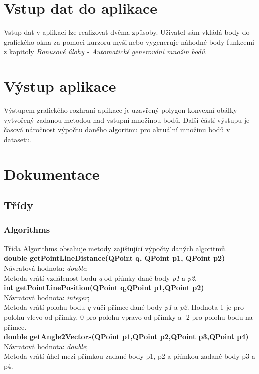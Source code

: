 \documentclass[a4paper, 12pt]{article}
\begin{document}
\section{Vstup dat do aplikace}
Vstup dat v aplikaci lze realizovat dvěma způsoby. Uživatel sám vkládá body do grafického okna za pomoci kurzoru myši nebo vygeneruje náhodné body funkcemi z kapitoly \textit{Bonusové úlohy - Automatické generování množin bodů}.

\section{Výstup aplikace}
Výstupem grafického rozhraní aplikace je uzavřený polygon konvexní obálky vytvořený zadanou metodou nad vstupní množinou bodů. Další částí výstupu je časová náročnost výpočtu daného algoritmu pro aktuální množinu bodů v datasetu. 

\section{Dokumentace}
\subsection{Třídy}
\subsubsection{Algorithms}
Třída Algorithms obsahuje metody zajišťující výpočty daných algoritmů.
\\

\textbf{double getPointLineDistance(QPoint q, QPoint p1, QPoint p2)}\\
Návratová hodnota: \textit{double};\\
Metoda vrátí vzdálenost bodu \textit{q} od přímky dané body\textit{ p1} a \textit{p2}.
\\

\textbf{int getPointLinePosition(QPoint q,QPoint p1,QPoint p2)}\\
Návratová hodnota: \textit{integer};\\
Metoda vrátí polohu bodu \textit{q} vůči přímce dané body\textit{ p1} a \textit{p2}. Hodnota 1 je pro polohu vlevo od přímky, 0 pro polohu vpravo od přímky a -2 pro polohu bodu na přímce.
\\

\textbf{double getAngle2Vectors(QPoint p1,QPoint p2,QPoint p3,QPoint p4)}\\
Návratová hodnota: \textit{double};\\
Metoda vrátí úhel mezi přímkou zadané body p1, p2  a přímkou zadané body p3 a p4.
\\
\end{document}
